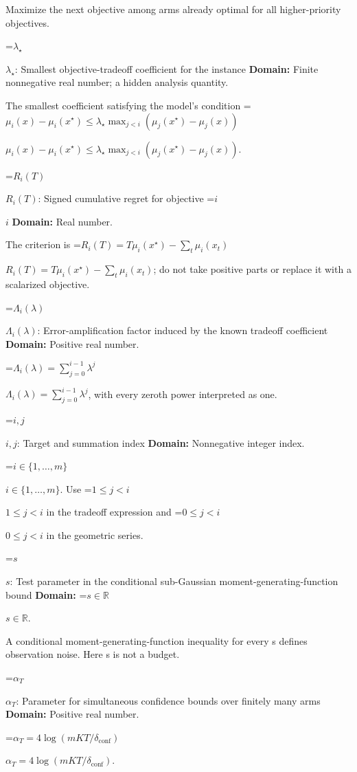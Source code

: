 \documentclass[10pt,a4paper]{article}
\newcommand{\AtlasMath}[1]{\par\begingroup\centering\setbox0=\hbox{$\displaystyle #1$}\ifdim\wd0>1.4\linewidth\typeout{ATLAS WIDE FORMULA: \the\wd0}\fi\ifdim\wd0>\linewidth\resizebox{\linewidth}{!}{\box0}\else\box0\fi\par\endgroup}
\newcommand{\AtlasInlineMath}[1]{\begingroup\setbox0=\hbox{$#1$}\ifdim\wd0>.4\linewidth\endgroup\AtlasMath{#1}\else\endgroup$#1$\fi}
\begin{document}
Maximize the next objective among arms already optimal for all higher-priority objectives.



\AtlasInlineMath{\lambda_\star}: Smallest objective-tradeoff coefficient for the instance \textbf{Domain:} Finite nonnegative real number; a hidden analysis quantity.



The smallest coefficient satisfying the model's condition \AtlasInlineMath{\mu_i(x)-\mu_i(x^\star)\le\lambda_\star\max_{j<i}(\mu_j(x^\star)-\mu_j(x))}.



\AtlasInlineMath{R_i(T)}: Signed cumulative regret for objective \AtlasInlineMath{i} \textbf{Domain:} Real number.



The criterion is \AtlasInlineMath{R_i(T)=T\mu_i(x^\star)-\sum_t\mu_i(x_t)}; do not take positive parts or replace it with a scalarized objective.



\AtlasInlineMath{\Lambda_i(\lambda)}: Error-amplification factor induced by the known tradeoff coefficient \textbf{Domain:} Positive real number.



\AtlasInlineMath{\Lambda_i(\lambda)=\sum_{j=0}^{i-1}\lambda^j}, with every zeroth power interpreted as one.



\AtlasInlineMath{i,j}: Target and summation index \textbf{Domain:} Nonnegative integer index.



\AtlasInlineMath{i\in\{1,\ldots,m\}}. Use \AtlasInlineMath{1\le j<i} in the tradeoff expression and \AtlasInlineMath{0\le j<i} in the geometric series.



\AtlasInlineMath{s}: Test parameter in the conditional sub-Gaussian moment-generating-function bound \textbf{Domain:} \AtlasInlineMath{s\in\mathbb R}.



A conditional moment-generating-function inequality for every s defines observation noise. Here s is not a budget.



\AtlasInlineMath{\alpha_T}: Parameter for simultaneous confidence bounds over finitely many arms \textbf{Domain:} Positive real number.



\AtlasInlineMath{\alpha_T=4\log(mKT/\delta_{\mathrm{conf}})}.
\end{document}
